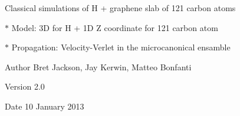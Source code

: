 Classical simulations of H + graphene slab of 121 carbon atoms \par
 $\ast$ Model: 3D for H + 1D Z coordinate for 121 carbon atom \par
 $\ast$ Propagation: Velocity-\/Verlet in the microcanonical ensamble \begin{DoxyAuthor}{Author}
Bret Jackson, Jay Kerwin, Matteo Bonfanti 
\end{DoxyAuthor}
\begin{DoxyVersion}{Version}
2.0 
\end{DoxyVersion}
\begin{DoxyDate}{Date}
10 January 2013 
\end{DoxyDate}

